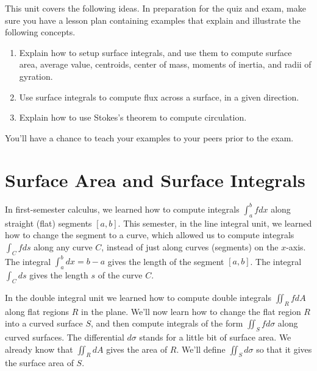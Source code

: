 
\noindent 
This unit covers the following ideas. In preparation for the quiz and exam, make sure you have a lesson plan containing examples that explain and illustrate the following concepts.  
\begin{enumerate}
\item Explain how to setup surface integrals, and use them to compute surface area, average value, centroids, center of mass, moments of inertia, and radii of gyration.
\item Use surface integrals to compute flux across a surface, in a given direction. 
\item Explain how to use Stokes's theorem to compute circulation. 
\end{enumerate}
You'll have a chance to teach your examples to your peers prior to the exam.


\section{Surface Area and Surface Integrals}

In first-semester calculus, we learned how to compute integrals $\int_a^b f dx$ along straight (flat) segments $[a,b]$. This semester, in the line integral unit, we learned how to change the segment to a curve, which allowed us to compute integrals $\int_C fds$ along any curve $C$, instead of just along curves (segments) on the $x$-axis. The integral $\int_a^b dx=b-a$ gives the length of the segment $[a,b]$. The integral $\int_C ds$ gives the length $s$ of the curve $C$.  

In the double integral unit we learned how to compute double integrals $\iint_R fdA$ along flat regions $R$ in the plane. We'll now learn how to change the flat region $R$ into a curved surface $S$, and then compute integrals of the form $\iint_S fd\sigma$ along curved surfaces. The differential $d\sigma$ stands for a little bit of surface area.  We already know that $\iint_R dA$ gives the area of $R$.  We'll define $\iint_S d\sigma$ so that it gives the surface area of $S$.



